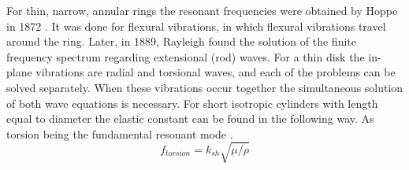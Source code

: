 \begin{doublespacing}
For thin, narrow, annular rings the resonant frequencies were obtained by Hoppe in 1872 \cite{hoppe1871vibrationen}. It was done for flexural vibrations, in which flexural vibrations travel around the ring. Later, in 1889, Rayleigh \cite{rayleigh1888free} found the solution of the finite frequency spectrum regarding extensional (rod) waves. For a thin disk the in-plane vibrations are radial and torsional waves, and each of the problems can be solved separately. When these vibrations occur together the simultaneous solution of both wave equations is necessary. For short isotropic cylinders with length equal to diameter the elastic constant can be found in the following way. As torsion being the fundamental resonant mode \cite{wang2003resonant}. 
\begin{equation}
f_{torsion} = k_{sh} \sqrt{\mu/\rho}
\end{equation}


\end{doublespacing}
